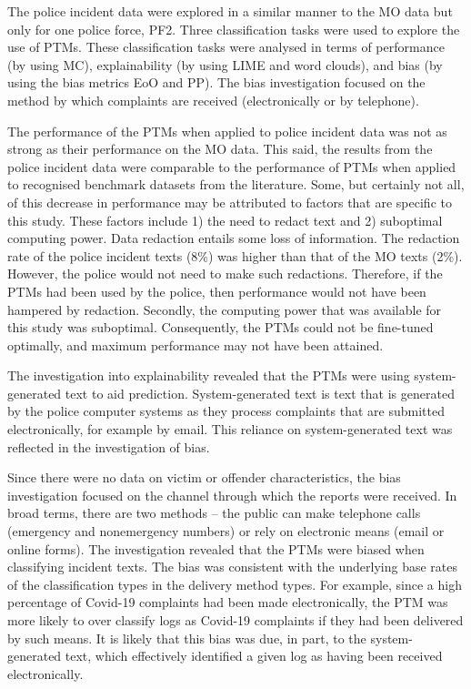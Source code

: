 The police incident data were explored in a similar manner to the MO data but only for one police force, PF2. Three classification tasks were used to explore the use of PTMs. These classification tasks were analysed in terms of performance (by using MC), explainability (by using LIME and word clouds), and bias (by using the bias metrics EoO and PP). The bias investigation focused on the method by which complaints are received (electronically or by telephone).

The performance of the PTMs when applied to police incident data was not as strong as their performance on the MO data. This said, the results from the police incident data were comparable to the performance of PTMs when applied to recognised benchmark datasets from the literature. Some, but certainly not all, of this decrease in performance may be attributed to factors that are specific to this study. These factors include 1) the need to redact text and 2) suboptimal computing power. Data redaction entails some loss of information. The redaction rate of the police incident texts (8\%) was higher than that of the MO texts (2\%). However, the police would not need to make such redactions. Therefore, if the PTMs had been used by the police, then performance would not have been hampered by redaction. Secondly, the computing power that was available for this study was suboptimal. Consequently, the PTMs could not be fine-tuned optimally, and maximum performance may not have been attained.

The investigation into explainability revealed that the PTMs were using system-generated text to aid prediction. System-generated text is text that is generated by the police computer systems as they process complaints that are submitted electronically, for example by email. This reliance on system-generated text was reflected in the investigation of bias.

Since there were no data on victim or offender characteristics, the bias investigation focused on the channel through which the reports were received. In broad terms, there are two methods – the public can make telephone calls (emergency and nonemergency numbers) or rely on electronic means (email or online forms). The investigation revealed that the PTMs were biased when classifying incident texts. The bias was consistent with the underlying base rates of the classification types in the delivery method types. For example, since a high percentage of Covid-19 complaints had been made electronically, the PTM was more likely to over classify logs as Covid-19 complaints if they had been delivered by such means. It is likely that this bias was due, in part, to the system-generated text, which effectively identified a given log as having been received electronically.

